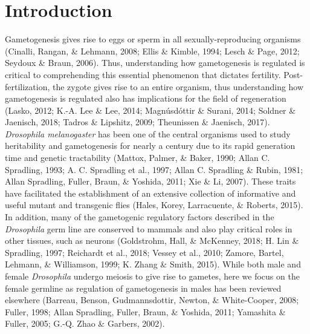 \documentclass[12pt,oneside]{reedthesis}
\begin{document}
\hypertarget{introduction}{%
\section{Introduction}\label{introduction}}

Gametogenesis gives rise to eggs or sperm in all sexually-reproducing
organisms (Cinalli, Rangan, \& Lehmann, 2008; Ellis \& Kimble, 1994; Lesch \& Page, 2012; Seydoux \& Braun, 2006).
Thus, understanding how gametogenesis is regulated is critical to
comprehending this essential phenomenon that dictates fertility.
Post-fertilization, the zygote gives rise to an entire organism, thus
understanding how gametogenesis is regulated also has implications for
the field of regeneration (Lasko, 2012; K.-A. Lee \& Lee, 2014; Magnúsdóttir \& Surani, 2014; Soldner \& Jaenisch, 2018; Tadros \& Lipshitz, 2009; Theunissen \& Jaenisch, 2017).
\emph{Drosophila melanogaster} has been one of the central organisms used to
study heritability and gametogenesis for nearly a century due to its
rapid generation time and genetic tractability (Mattox, Palmer, \& Baker, 1990; Allan C. Spradling, 1993; A. C. Spradling et al., 1997; Allan C. Spradling \& Rubin, 1981; Allan Spradling, Fuller, Braun, \& Yoshida, 2011; Xie \& Li, 2007). These traits have facilitated the establishment of an
extensive collection of informative and useful mutant and transgenic
flies (Hales, Korey, Larracuente, \& Roberts, 2015). In addition, many of the gametogenic regulatory
factors described in the \emph{Drosophila} germ line are conserved to mammals
and also play critical roles in other tissues, such as neurons
(Goldstrohm, Hall, \& McKenney, 2018; H. Lin \& Spradling, 1997; Reichardt et al., 2018; Vessey et al., 2010; Zamore, Bartel, Lehmann, \& Williamson, 1999; K. Zhang \& Smith, 2015). While both male and female \emph{Drosophila}
undergo meiosis to give rise to gametes, here we focus on the female
germline as regulation of gametogenesis in males has been reviewed
elsewhere (Barreau, Benson, Gudmannsdottir, Newton, \& White-Cooper, 2008; Fuller, 1998; Allan Spradling, Fuller, Braun, \& Yoshida, 2011; Yamashita \& Fuller, 2005; G.-Q. Zhao \& Garbers, 2002).
\end{document}
